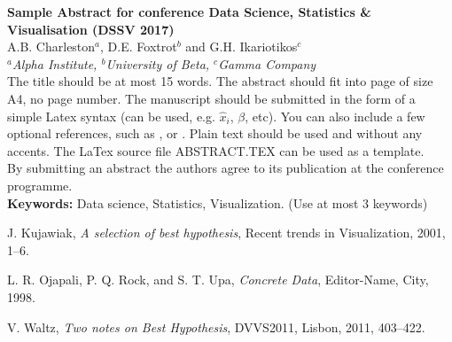 
\setlength{\textwidth}{160mm}\setlength{\textheight}{240mm}
\setlength{\oddsidemargin}{0mm}\setlength{\evensidemargin}{0mm}
\setlength{\topmargin}{-10mm}
\setlength{\parindent}{0mm} 
\pagestyle{empty}	%



{\Large\bf Sample Abstract for conference Data Science, Statistics \& Visualisation (DSSV 2017) }\\[4mm]

A.B. Charleston$^a$, D.E. Foxtrot$^b$ and G.H. Ikariotikos$^c$\\ 				

{\small \em $^a$Alpha Institute, $^b$University of Beta, $^c$Gamma 
Company}\\[3mm]


The title should be at most 15 words.
The abstract should fit into page of size A4, no page number. The manuscript should be submitted in the 
form of a simple Latex syntax (can be used, e.g. $\hat{x}_i$, $\beta$, etc). You can also 
include a few optional references, such as \cite{journal01}, \cite{book98} or \cite{procc11}. Plain text should be used and without any accents. The LaTex source file ABSTRACT.TEX can be used as a 
template.\\

By submitting an abstract the authors agree to its publication at 
the conference programme.\\



\textbf{Keywords:} Data science, Statistics, Visualization. (Use at most 3 keywords)

\begin{thebibliography}{00}
 J. Kujawiak, \emph{A selection of best hypothesis}, Recent trends in Visualization, 2001, 1--6.

L. R. Ojapali, P. Q. Rock, and S. T. Upa, \emph{Concrete Data}, Editor-Name, City, 1998.

 V. Waltz, \emph{Two notes on Best Hypothesis}, DVVS2011, Lisbon, 2011, 403--422.
\end{thebibliography}



